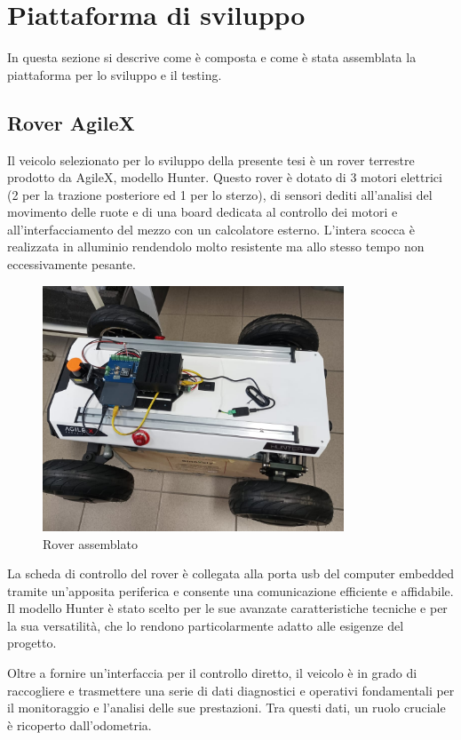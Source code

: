 \chapter{Piattaforma di sviluppo} \label{piattaforma_di_sviluppo}
In questa sezione si descrive come è composta e come è stata assemblata la piattaforma per lo sviluppo e il testing.

\section{Rover AgileX}
Il veicolo selezionato per lo sviluppo della presente tesi è un rover terrestre prodotto da AgileX, modello Hunter. Questo rover è dotato di 3 motori elettrici (2 per la trazione posteriore ed 1 per lo sterzo), di sensori dediti all'analisi del movimento delle ruote e di una board dedicata al controllo dei motori e all'interfacciamento del mezzo con un calcolatore esterno. L'intera scocca è realizzata in alluminio rendendolo molto resistente ma allo stesso tempo non eccessivamente pesante.

\begin{figure}[h]
  \centering
  \includegraphics[width=0.8\textwidth]{figures/franco.png}
  \caption{Rover assemblato}
  \label{Rover assemblato}
\end{figure}

\noindent La scheda di controllo del rover è collegata alla porta usb del computer embedded tramite un'apposita periferica e consente una comunicazione efficiente e affidabile. Il modello Hunter è stato scelto per le sue avanzate caratteristiche tecniche e per la sua versatilità, che lo rendono particolarmente adatto alle esigenze del progetto.

\noindent Oltre a fornire un'interfaccia per il controllo diretto, il veicolo è in grado di raccogliere e trasmettere una serie di dati diagnostici e operativi fondamentali per il monitoraggio e l'analisi delle sue prestazioni. Tra questi dati, un ruolo cruciale è ricoperto dall'odometria. 

